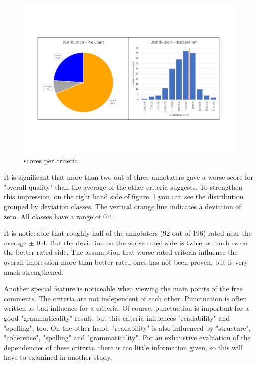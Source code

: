 \begin{figure}[H]
	\centering
	\includegraphics[trim=10 150 10 150, width=\textwidth]{img/deviation.pdf}
	\caption{scores per criteria}
	\label{fig:deviation}
\end{figure}

It is significant that more than two out of three annotaters gave a worse score for "overall quality" than the average of the other criteria suggests.
To strengthen this impression, on the right hand side of figure~\ref{fig:deviation} you can see the distribution grouped by deviation classes. The vertical orange line indicates a deviation of zero. All classes have a range of 0.4.

It is noticeable that roughly half of the annotaters (92 out of 196) rated near the average $\pm$ 0.4. But the deviation on the worse rated side is twice as much as on the better rated side.
The assumption that worse rated criteria influence the overall impression more than better rated ones has not been proven, but is very much strengthened.

Another special feature is noticeable when viewing the main points of the free comments.
The criteria are not independent of each other.
Punctuation is often written as bad influence for a criteria. Of course, punctuation is important for a good "grammaticality" result, but this criteria influences "readability" and "spelling", too.
On the other hand, "readability" is also influenced by "structure", "coherence", "spelling" and "grammaticality".
For an exhaustive evaluation of the dependencies of these criteria, there is too little information given, so this will have to examined in another study.



